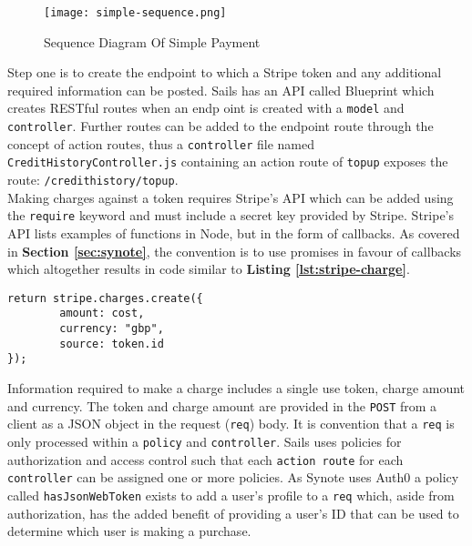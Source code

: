 \begin{figure}[!hbt]
  	\centering
 	\texttt{[image: simple-sequence.png]}
  	\caption{Sequence Diagram Of Simple Payment}
 	\label{fig:simple-sequence}
\end{figure}

Step one is to create the endpoint to which a Stripe token and any additional required information can be posted. Sails has an API called Blueprint which creates RESTful routes when an endp oint is created with a \texttt{model} and \texttt{controller}. Further routes can be added to the endpoint route through the concept of action routes, thus a \texttt{controller} file named \texttt{CreditHistoryController.js} containing an action route of \texttt{topup} exposes the route: \texttt{/credithistory/topup}.\\

Making charges against a token requires Stripe's API \cite{stripe-api} which can be added using the \texttt{require} keyword and must include a secret key provided by Stripe. Stripe's API lists examples of functions in Node, but in the form of callbacks. As covered in \textbf{Section \ref{sec:synote}}, the convention is to use promises in favour of callbacks which altogether results in code similar to \textbf{Listing \ref{lst:stripe-charge}}.\\

\hspace{0.1\textwidth}
\begin{minipage}{.76\textwidth}

\begin{listing}[H]
\begin{verbatim}
return stripe.charges.create({
        amount: cost,
        currency: "gbp",
        source: token.id
});
\end{verbatim}
\label{lst:stripe-charge}
\end{listing}
\end{minipage}
\hspace{0.1\textwidth}
\vspace{0.3cm}

Information required to make a charge includes a single use token, charge amount and currency. The token and charge amount are provided in the \texttt{POST} from a client as a JSON object in the request (\texttt{req}) body. It is convention that a \texttt{req} is only processed within a \texttt{policy} and \texttt{controller}. Sails uses policies for authorization and access control such that each \texttt{action route} for each \texttt{controller} can be assigned one or more policies. As Synote uses Auth0 \cite{auth0} a policy called \texttt{hasJsonWebToken} exists to add a user's profile to a \texttt{req} which, aside from authorization, has the added benefit of providing a user's ID that can be used to determine which user is making a purchase.\\

